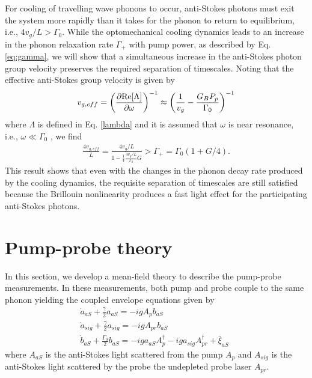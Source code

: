 For cooling of travelling wave phonons to occur, anti-Stokes photons must exit the system more rapidly than it takes for the phonon to return to equilibrium, i.e., $4 v_g/L > \Gamma_0$. While the optomechanical cooling dynamics leads to an increase in the phonon relaxation rate $\Gamma_+$ with pump power, as described by Eq. \eqref{eq:gamma}, we will show that a simultaneous increase in the anti-Stokes photon group velocity preserves the required separation of timescales. Noting that the effective anti-Stokes group velocity is given by
\begin{align}
v_{g,eff} = \left(
\frac{\partial {\rm Re}[\Lambda]}
 {\partial \omega}\right)^{-1}  \approx \left(\frac{1}{v_{g}} - \frac{G_B P_p}{\Gamma_0} \right)^{-1}
\end{align}
where $\Lambda$ is defined in Eq. \eqref{lambda} and it is assumed that $\omega$ is near resonance, i.e., $\omega \ll \Gamma_0$ \cite{okawachi2005tunable,gonzalez2005optically}, we find
\begin{align}
\frac{4 v_{g,eff}}{L} = \frac{4 v_g/L}{1- \frac{1}{4} \frac{4 v_g/L}{\Gamma_0} G}
> \Gamma_+ = \Gamma_0(1+G/4).
\end{align}
This result shows that even with the changes in the phonon decay rate produced by the cooling dynamics, the requisite separation of timescales are still satisfied  because the Brillouin nonlinearity produces a fast light effect for the participating anti-Stokes photons.

\section{Pump-probe theory}
\label{SI:pump-probe}
In this section, we develop a mean-field theory to describe the pump-probe measurements. In these measurements, both pump and probe couple to the same phonon yielding the coupled envelope equations given by
\begin{eqnarray}
\label{eq:pump-probe}
   && \dot{a}_{aS} + \frac{\gamma}{2} a_{aS} = -i g A_p b_{aS} \\
   && \dot{a}_{sig} + \frac{\gamma}{2} a_{sig} = -i g A_{pr} b_{aS} \\
   && \dot{b}_{aS} + \frac{\Gamma_0}{2} b_{aS}  = -i g a_{aS} A_p^\dag -i g a_{sig} A_{pr}^\dag + \bar{\xi}_{aS} \quad \quad
\end{eqnarray}
where $A_{aS}$ is the anti-Stokes light scattered from the pump $A_p$ and $A_{sig}$ is the anti-Stokes light scattered by the probe the undepleted probe laser $A_{pr}$.

